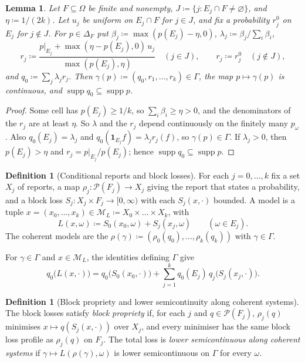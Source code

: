 \documentclass[11pt]{article}
\newtheorem{lemma}[theorem]{Lemma}
\theoremstyle{definition}
\newtheorem{definition}[theorem]{Definition}
\theoremstyle{remark}
\newcommand{\M}{\mathcal M}
\newcommand{\PP}{\mathcal P}
\newcommand{\one}{\mathbf 1}
\newcommand{\supp}{\operatorname{supp}}
\begin{document}
\begin{lemma}\label{lem:section}
Let $F\subseteq\Omega$ be finite and nonempty, $J\coloneqq\{j:E_j\cap F\ne\varnothing\}$, and $\eta\coloneqq1/(2k)$. Let $u_j$ be uniform on $E_j\cap F$ for $j\in J$, and fix a probability $r_j^0$ on $E_j$ for $j\notin J$. For $p\in\Delta_F$ put $\beta_j\coloneqq\max(p(E_j)-\eta,0)$, $\lambda_j\coloneqq\beta_j/\sum_i\beta_i$,
\[
r_j\coloneqq\frac{p|_{E_j}+\max(\eta-p(E_j),0)\,u_j}{\max(p(E_j),\eta)}\quad(j\in J),\qquad r_j\coloneqq r_j^0\quad(j\notin J),
\]
and $q_0\coloneqq\sum_j\lambda_jr_j$. Then $\gamma(p)\coloneqq(q_0,r_1,\dots,r_k)\in\Gamma$, the map $p\mapsto\gamma(p)$ is continuous, and $\supp q_0\subseteq\supp p$.
\end{lemma}
\begin{proof}
Some cell has $p(E_j)\ge1/k$, so $\sum_i\beta_i\ge\eta>0$, and the denominators of the $r_j$ are at least $\eta$. So $\lambda$ and the $r_j$ depend continuously on the finitely many $p_\omega$. Also $q_0(E_j)=\lambda_j$ and $q_0(\one_{E_j}f)=\lambda_jr_j(f)$, so $\gamma(p)\in\Gamma$. If $\lambda_j>0$, then $p(E_j)>\eta$ and $r_j=p|_{E_j}/p(E_j)$; hence $\supp q_0\subseteq\supp p$.
\end{proof}

\begin{definition}[Conditional reports and block losses]\label{def:block-reports}
For each $j=0,\dots,k$ fix a set $X_j$ of reports, a map $\rho_j:\PP(F_j)\to X_j$ giving the report that states a probability, and a block loss $S_j:X_j\times F_j\to[0,\infty)$ with each $S_j(x,\cdot)$ bounded. A model is a tuple $x=(x_0,\dots,x_k)\in\M_L\coloneqq X_0\times\dots\times X_k$, with
\[
L(x,\omega)\coloneqq S_0(x_0,\omega)+S_j(x_j,\omega)\qquad(\omega\in E_j).
\]
The coherent models are the $\rho(\gamma)\coloneqq(\rho_0(q_0),\dots,\rho_k(q_k))$ with $\gamma\in\Gamma$.
\end{definition}

For $\gamma\in\Gamma$ and $x\in\M_L$, the identities defining $\Gamma$ give
\begin{equation}\label{eq:blocks}
q_0\bigl(L(x,\cdot)\bigr)=q_0\bigl(S_0(x_0,\cdot)\bigr)+\sum_{j=1}^kq_0(E_j)\,q_j\bigl(S_j(x_j,\cdot)\bigr).
\end{equation}

\begin{definition}[Block propriety and lower semicontinuity along coherent systems]\label{def:block-propriety}
The block losses satisfy \emph{block propriety} if, for each $j$ and
$q\in\PP(F_j)$, $\rho_j(q)$ minimises $x\mapsto q(S_j(x,\cdot))$ over $X_j$,
and every minimiser has the same block loss profile as $\rho_j(q)$ on $F_j$.
The total loss is \emph{lower semicontinuous along coherent systems} if
$\gamma\mapsto L(\rho(\gamma),\omega)$ is lower semicontinuous on $\Gamma$ for every $\omega$.
\end{definition}
\end{document}
